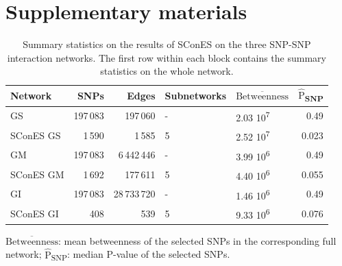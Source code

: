 \documentclass[twocolumn, 10pt]{article}
\newcommand{\mean}[1]{$\overline{\mbox{#1}}$}
\newcommand{\median}[1]{$\hat{\mbox{#1}}$}
\begin{document}



\clearpage
\setcounter{figure}{0}
\setcounter{section}{0}
\setcounter{table}{0}

\section*{Supplementary materials}

\begin{table}[htbp]
\begin{threeparttable}
\caption{\label{tab:snp_solutions}
Summary statistics on the results of SConES on the three SNP-SNP interaction networks. The first row within each block contains the summary statistics on the whole network.}
\centering
\begin{tabular}{lrrllr}
Network & SNPs & Edges & Subnetworks & \mean{Betweenness} & \median{P}\textsubscript{SNP}\\
\hline
GS & 197\,083 & 197\,060 & - & 2.03 \texttimes{} 10\textsuperscript{7} & 0.49\\
SConES GS & 1\,590 & 1\,585 & 5 & 2.52 \texttimes{} 10\textsuperscript{7} & 0.023\\
\hline
GM & 197\,083 & 6\,442\,446 & - & 3.99 \texttimes{} 10\textsuperscript{6} & 0.49\\
SConES GM & 1\,692 & 177\,611 & 5 & 4.40 \texttimes{} 10\textsuperscript{6} & 0.055\\
\hline
GI & 197\,083 & 28\,733\,720 & - & 1.46 \texttimes{} 10\textsuperscript{6} & 0.49\\
SConES GI & 408 & 539 & 5 & 9.33 \texttimes{} 10\textsuperscript{6} & 0.076\\
\end{tabular}
\begin{tablenotes}
\mean{Betweenness}: mean betweenness of the selected SNPs in the corresponding full network; \median{P}\textsubscript{SNP}: median P-value of the selected SNPs.
\end{tablenotes}
\end{threeparttable}
\end{table}
\end{document}
